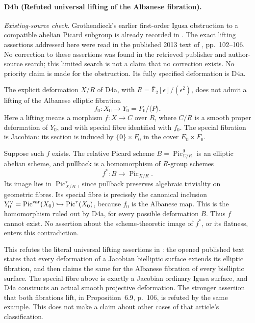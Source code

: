 \paragraph{D4b (Refuted universal lifting of the Albanese fibration).}
\emph{Existing-source check.}
Grothendieck's earlier first-order Igusa obstruction to a compatible
abelian Picard subgroup is already recorded in
\cite[Remark 3.4, p.~238]{DGJ_FGAVI1962}.
The exact lifting assertions addressed here were read in the published
2013 text of \cite{DGJ_Partsch2013}, pp.~102--106.
No correction to these assertions was found in the retrieved
publisher and author-source search; this limited search is not a
claim that no correction exists. No priority claim is made for the
obstruction. Its fully specified deformation is D4a.

The explicit deformation $X/R$ of D4a, with
$R=\overline{\mathbb F}_2[\epsilon]/(\epsilon^2)$, does not
admit a lifting of the Albanese elliptic fibration
\[
 f_0:X_0\longrightarrow Y_0=F_0/\langle P\rangle.
\]
Here a lifting means a morphism $f:X\to C$ over $R$, where
$C/R$ is a smooth proper deformation of $Y_0$, and with
special fibre identified with $f_0$. The special fibration is
Jacobian: its section is induced by $\{0\}\times F_0$ in the
cover $E_0\times F_0$.

Suppose such $f$ exists. The relative Picard scheme
$B=\operatorname{Pic}^0_{C/R}$ is an elliptic abelian scheme,
and pullback is a homomorphism of $R$-group schemes
\[
 f^*:B\longrightarrow\operatorname{Pic}_{X/R}.
\]
Its image lies in $\operatorname{Pic}^{\tau}_{X/R}$, since
pullback preserves algebraic triviality on geometric fibres.
Its special fibre is precisely the canonical inclusion
$Y_0^\vee=\operatorname{Pic}^{\rm var}(X_0)
\hookrightarrow\operatorname{Pic}^{\tau}(X_0)$, because $f_0$
is the Albanese map. This is the homomorphism ruled out by
D4a, for every possible deformation $B$. Thus $f$ cannot
exist. No assertion about the scheme-theoretic image of
$f^*$, or its flatness, enters this contradiction.

This refutes the literal universal lifting assertions in
\cite[Proposition 6.6, pp.~102--103; Theorem 6.7, p.~104]{DGJ_Partsch2013}:
the opened published text states that every deformation of
a Jacobian bielliptic surface extends its elliptic fibration,
and then claims the same for the Albanese fibration of every
bielliptic surface. The special fibre above is exactly a
Jacobian ordinary Igusa surface, and D4a constructs an actual
smooth projective deformation. The stronger assertion that
both fibrations lift, in Proposition~6.9, p.~106, is refuted
by the same example. This does not make a claim about other
cases of that article's classification.


